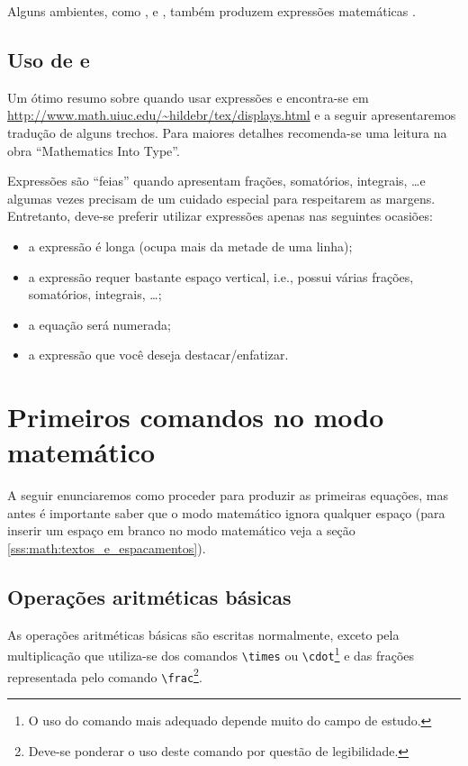 Alguns ambientes, como ,  e ,
também produzem expressões matemáticas .

\subsection{Uso de  e }
Um ótimo resumo sobre quando usar expressões  e 
encontra-se em
\url{http://www.math.uiuc.edu/~hildebr/tex/displays.html}\nocite{Hildebrand:TeX_Resoures}
e a seguir apresentaremos tradução de alguns trechos. Para maiores detalhes
recomenda-se uma leitura na obra ``Mathematics Into
Type''\nocite{Swanson:1999:Mathematics}.

Expressões  são ``feias'' quando apresentam frações, somatórios,
integrais, \ldots e algumas vezes precisam de um cuidado especial para
respeitarem as margens. Entretanto, deve-se preferir utilizar expressões
 apenas nas seguintes ocasiões:
\begin{itemize}
  \item a expressão é longa (ocupa mais da metade de uma linha);
  \item a expressão requer bastante espaço vertical, i.e., possui várias
    frações, somatórios, integrais, \ldots;
  \item a equação será numerada;
  \item a expressão que você deseja destacar/enfatizar.
\end{itemize}

\section{Primeiros comandos no modo matemático}
A seguir enunciaremos como proceder para produzir as primeiras equações, mas
antes é importante saber que o modo matemático ignora qualquer espaço (para
inserir um espaço em branco no modo matemático veja a seção
\ref{sss:math:textos_e_espacamentos}).

\subsection{Operações aritméticas básicas}
As operações aritméticas básicas são escritas normalmente,
exceto pela multiplicação que utiliza-se dos comandos \lstinline!\times! ou
\lstinline!\cdot!\footnote{O uso do comando mais adequado depende muito do campo
de estudo.} e das frações representada pelo comando
\lstinline!\frac!\footnote{Deve-se ponderar o uso deste comando por questão de
legibilidade.}. \\

